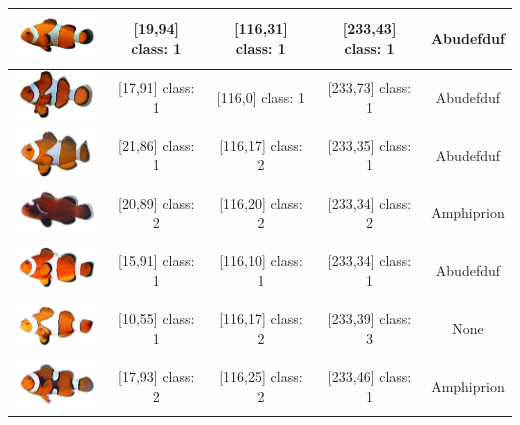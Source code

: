 \begin{longtable}{|c|c|c|c|c|}
	\includegraphics[width=3cm]{gambar/dataset_validasi/Amphiprion07} & [19,94] class: 1 & [116,31] class: 1 & [233,43] class: 1 & Abudefduf \\ \hline
	\includegraphics[width=3cm]{gambar/dataset_validasi/Amphiprion08} & [17,91] class: 1 & [116,0] class: 1 & [233,73] class: 1 & Abudefduf \\ \hline
	\includegraphics[width=3cm]{gambar/dataset_validasi/Amphiprion09} & [21,86] class: 1 & [116,17] class: 2 & [233,35] class: 1 & Abudefduf \\ \hline
	\includegraphics[width=3cm]{gambar/dataset_validasi/Amphiprion10} & [20,89] class: 2 & [116,20] class: 2 & [233,34] class: 2 & Amphiprion \\ \hline
	\includegraphics[width=3cm]{gambar/dataset_validasi/Amphiprion11} & [15,91] class: 1 & [116,10] class: 1 & [233,34] class: 1 & Abudefduf \\ \hline
	\includegraphics[width=3cm]{gambar/dataset_validasi/Amphiprion12} & [10,55] class: 1 & [116,17] class: 2 & [233,39] class: 3 & None \\ \hline
	\includegraphics[width=3cm]{gambar/dataset_validasi/Amphiprion13} & [17,93] class: 2 & [116,25] class: 2 & [233,46] class: 1 & Amphiprion \\ \hline

\end{longtable}
